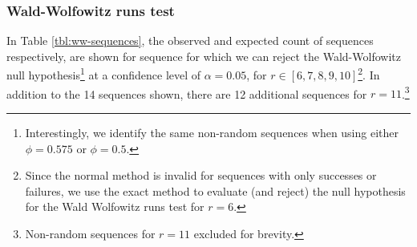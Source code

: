 \documentclass{article}
\begin{document}
\hypertarget{wald-wolfowitz-runs-test-1}{%
\subsubsection{Wald-Wolfowitz runs
test}\label{wald-wolfowitz-runs-test-1}}

In Table \ref{tbl:ww-sequences}, the observed and expected count of
sequences respectively, are shown for sequence for which we can reject
the Wald-Wolfowitz null hypothesis\footnote{Interestingly, we identify
  the same non-random sequences when using either \(\phi = 0.575\) or
  \(\phi = 0.5\).} at a confidence level of \(\alpha = 0.05\), for
\(r \in [6, 7, 8, 9, 10]\)\footnote{Since the normal method is invalid
  for sequences with only successes or failures, we use the exact method
  to evaluate (and reject) the null hypothesis for the Wald Wolfowitz
  runs test for \(r = 6\).}. In addition to the 14 sequences shown,
there are 12 additional sequences for \(r = 11\).\footnote{Non-random
  sequences for \(r = 11\) excluded for brevity.}
\end{document}
